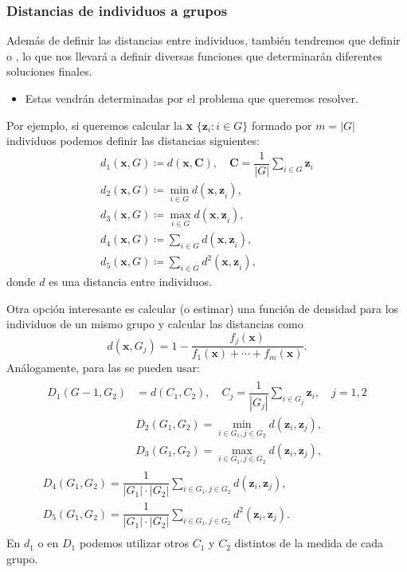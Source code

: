 \subsubsection{Distancias de individuos a grupos}
Además de definir las distancias entre individuos, también tendremos que definir  o , lo que nos llevará a definir diversas funciones  que determinarán diferentes soluciones finales.
\begin{itemize}
\item Estas vendrán determinadas por el problema que queremos resolver.
\end{itemize}
Por ejemplo, si queremos calcular la  \textbf{x}  $\{\mathbf{z}_i:i\in G\}$ formado por $m=|G|$ individuos podemos definir las distancias siguientes: \[ \begin{array}{c}
d_1(\mathbf{x},G)\coloneq d(\mathbf{x,C}),\quad \mathbf{C}=\dfrac{1}{|G|}\sum_{i\in G}\mathbf{z}_i\\
d_2(\mathbf{x},G)\coloneq\min_{i\in G}d(\mathbf{x,z}_i),\\
d_3(\mathbf{x},G)\coloneq\max_{i\in G}d(\mathbf{x,z}_i),\\
d_4(\mathbf{x},G)\coloneq\sum_{i\in G}d(\mathbf{x,z}_i),\\
d_5(\mathbf{x},G)\coloneq\sum_{i\in G}d^2(\mathbf{x,z}_i),
\end{array} \]donde $d$ es una distancia entre individuos.

Otra opción interesante es calcular (o estimar) una función de densidad para los individuos de un mismo grupo y calcular las distancias como \[ d(\mathbf{x},G_j)=1-\dfrac{f_j(\mathbf{x})}{f_1(\mathbf{x})+\cdots+f_m(\mathbf{x})}. \]
Análogamente, para las  se pueden usar: \[ \begin{array}{c}
\begin{aligned}
D_1(G-1,G_2)&=d(C_1,C_2),\quad C_j=\dfrac{1}{|G_j|}\sum_{i\in G_j}\mathbf{z}_i,\quad j=1,2\\
&D_2(G_1,G_2)=\min_{i\in G_1,j\in G_2}d(\mathbf{z}_i,\mathbf{z}_j),\\
&D_3(G_1,G_2)=\max_{i\in G_1,j\in G_2}d(\mathbf{z}_i,\mathbf{z}_j),
\end{aligned}\\
D_4(G_1,G_2)=\dfrac{1}{|G_1|\cdot|G_2|}\sum_{i\in G_1,j\in G_2}d(\mathbf{z}_i,\mathbf{z}_j),\\
D_5(G_1,G_2)=\dfrac{1}{|G_1|\cdot|G_2|}\sum_{i\in G_1,j\in G_2}d^2(\mathbf{z}_i,\mathbf{z}_j).\\
\end{array} \]
En $d_1$ o en $D_1$ podemos utilizar otros  $C_1$ y $C_2$ distintos de la medida de cada grupo.

